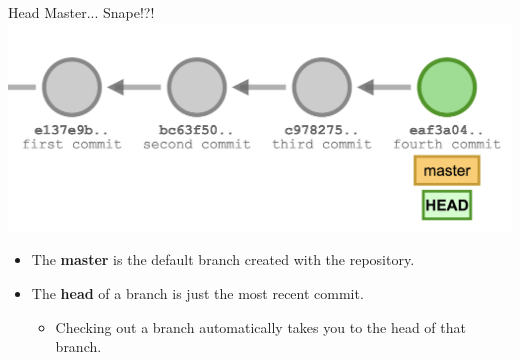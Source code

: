 \documentclass[11pt]{beamer}
\begin{document}
\begin{frame}{Head Master... Snape!?!}
\center
\includegraphics[scale=0.2]{commitchain.png}
\begin{itemize}
\item The \textbf{master} is the default branch created with the repository. 
\item The \textbf{head} of a branch is just the most recent commit.  
\begin{itemize}
\item Checking out a branch automatically takes you to the head of that branch.  
\end{itemize}
\end{itemize}
\end{frame}
\end{document}
